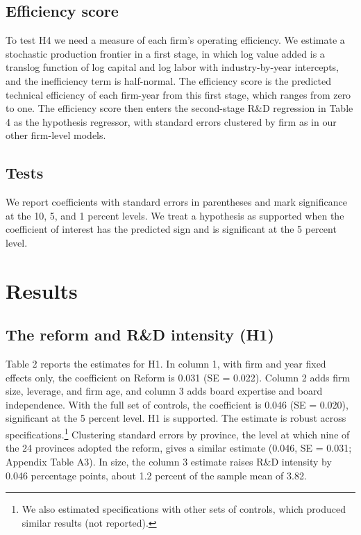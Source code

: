 \documentclass[12pt]{article}
\begin{document}
\subsection{Efficiency score}

To test H4 we need a measure of each firm's operating efficiency. We estimate a stochastic production frontier in a first stage, in which log value added is a translog function of log capital and log labor with industry-by-year intercepts, and the inefficiency term is half-normal. The efficiency score is the predicted technical efficiency of each firm-year from this first stage, which ranges from zero to one. The efficiency score then enters the second-stage R\&D regression in Table 4 as the hypothesis regressor, with standard errors clustered by firm as in our other firm-level models.

\subsection{Tests}

We report coefficients with standard errors in parentheses and mark significance at the 10, 5, and 1 percent levels. We treat a hypothesis as supported when the coefficient of interest has the predicted sign and is significant at the 5 percent level.

\section{Results}

\subsection{The reform and R\&D intensity (H1)}

Table 2 reports the estimates for H1. In column 1, with firm and year fixed effects only, the coefficient on Reform is 0.031 (SE = 0.022). Column 2 adds firm size, leverage, and firm age, and column 3 adds board expertise and board independence. With the full set of controls, the coefficient is 0.046 (SE = 0.020), significant at the 5 percent level. H1 is supported. The estimate is robust across specifications.\footnote{We also estimated specifications with other sets of controls, which produced similar results (not reported).} Clustering standard errors by province, the level at which nine of the 24 provinces adopted the reform, gives a similar estimate (0.046, SE = 0.031; Appendix Table A3). In size, the column 3 estimate raises R\&D intensity by 0.046 percentage points, about 1.2 percent of the sample mean of 3.82.
\end{document}
